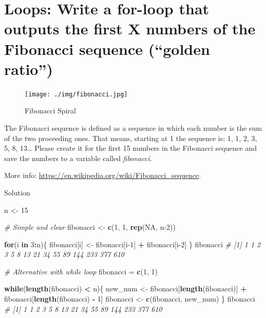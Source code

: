 \documentclass[
]{book}
\newenvironment{Shaded}{\begin{snugshade}}{\end{snugshade}}
\newcommand{\CommentTok}[1]{\textcolor[rgb]{0.56,0.35,0.01}{\textit{#1}}}
\newcommand{\ConstantTok}[1]{\textcolor[rgb]{0.56,0.35,0.01}{#1}}
\newcommand{\ControlFlowTok}[1]{\textcolor[rgb]{0.13,0.29,0.53}{\textbf{#1}}}
\newcommand{\DecValTok}[1]{\textcolor[rgb]{0.00,0.00,0.81}{#1}}
\newcommand{\FunctionTok}[1]{\textcolor[rgb]{0.13,0.29,0.53}{\textbf{#1}}}
\newcommand{\NormalTok}[1]{#1}
\newcommand{\OtherTok}[1]{\textcolor[rgb]{0.56,0.35,0.01}{#1}}
\newcommand{\SpecialCharTok}[1]{\textcolor[rgb]{0.81,0.36,0.00}{\textbf{#1}}}
\begin{document}
\section{Loops: Write a for-loop that outputs the first X numbers of the Fibonacci sequence (``golden ratio'')}\label{loops-write-a-for-loop-that-outputs-the-first-x-numbers-of-the-fibonacci-sequence-golden-ratio}

\begin{figure}
\centering
\texttt{[image: ./img/fibonacci.jpg]}
\caption{Fibonacci Spiral}
\end{figure}

The Fibonacci sequence is defined as a sequence in which each number is the sum of the two proceeding ones.
That means, starting at 1 the sequence is: 1, 1, 2, 3, 5, 8, 13\ldots{}
Please create it for the first 15 numbers in the Fibonacci sequence and save the numbers to a variable called \emph{fibonacci}.

More info: \url{https://en.wikipedia.org/wiki/Fibonacci_sequence}.

Solution

\begin{Shaded}
\begin{Highlighting}[]
\NormalTok{n }\OtherTok{\textless{}{-}} \DecValTok{15}

\CommentTok{\# Simple and clear}
\NormalTok{fibonacci }\OtherTok{\textless{}{-}} \FunctionTok{c}\NormalTok{(}\DecValTok{1}\NormalTok{, }\DecValTok{1}\NormalTok{, }\FunctionTok{rep}\NormalTok{(}\ConstantTok{NA}\NormalTok{, n}\DecValTok{{-}2}\NormalTok{))}

\ControlFlowTok{for}\NormalTok{(i }\ControlFlowTok{in} \DecValTok{3}\SpecialCharTok{:}\NormalTok{n)\{}
\NormalTok{  fibonacci[i] }\OtherTok{\textless{}{-}}\NormalTok{ fibonacci[i}\DecValTok{{-}1}\NormalTok{] }\SpecialCharTok{+}\NormalTok{ fibonacci[i}\DecValTok{{-}2}\NormalTok{]}
\NormalTok{\}}
\NormalTok{fibonacci}
\CommentTok{\#  [1]   1   1   2   3   5   8  13  21  34  55  89 144 233 377 610}

\CommentTok{\# Alternative with while loop}
\NormalTok{fibonacci }\OtherTok{=} \FunctionTok{c}\NormalTok{(}\DecValTok{1}\NormalTok{, }\DecValTok{1}\NormalTok{)}

\ControlFlowTok{while}\NormalTok{(}\FunctionTok{length}\NormalTok{(fibonacci) }\SpecialCharTok{\textless{}}\NormalTok{ n)\{}
\NormalTok{  new\_num }\OtherTok{\textless{}{-}}\NormalTok{ fibonacci[}\FunctionTok{length}\NormalTok{(fibonacci)] }\SpecialCharTok{+}\NormalTok{ fibonacci[}\FunctionTok{length}\NormalTok{(fibonacci) }\SpecialCharTok{{-}} \DecValTok{1}\NormalTok{]}
\NormalTok{  fibonacci }\OtherTok{\textless{}{-}} \FunctionTok{c}\NormalTok{(fibonacci, new\_num)}
\NormalTok{\}}
\NormalTok{fibonacci}
\CommentTok{\#  [1]   1   1   2   3   5   8  13  21  34  55  89 144 233 377 610}
\end{Highlighting}
\end{Shaded}
\end{document}
